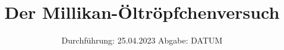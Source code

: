 

\subject{V503}
\title{Der Millikan-Öltröpfchenversuch}
\date{%
  Durchführung: 25.04.2023
  \hspace{3em}
  Abgabe: DATUM
}



\maketitle
\thispagestyle{empty}
\tableofcontents
\newpage








\printbibliography{}


